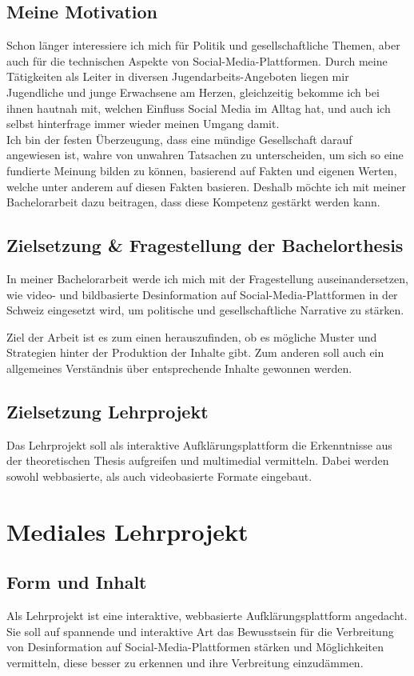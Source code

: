 \documentclass[12pt,a4paper]{article}        %
\begin{document}
\subsection{Meine Motivation}

Schon länger interessiere ich mich für Politik und gesellschaftliche Themen, aber auch für die technischen Aspekte von Social-Media-Plattformen. Durch meine Tätigkeiten als Leiter in diversen Jugendarbeits-Angeboten liegen mir Jugendliche und junge Erwachsene am Herzen, gleichzeitig bekomme ich bei ihnen hautnah mit, welchen Einfluss Social Media im Alltag hat, und auch ich selbst hinterfrage immer wieder meinen Umgang damit. \\
Ich bin der festen Überzeugung, dass eine mündige Gesellschaft darauf angewiesen ist, wahre von unwahren Tatsachen zu unterscheiden, um sich so eine fundierte Meinung bilden zu können, basierend auf Fakten und eigenen Werten, welche unter anderem auf diesen Fakten basieren. Deshalb möchte ich mit meiner Bachelorarbeit dazu beitragen, dass diese Kompetenz gestärkt werden kann.

\subsection{Zielsetzung \& Fragestellung der Bachelorthesis}
In meiner Bachelorarbeit werde ich mich mit der Fragestellung auseinandersetzen, wie video- und bildbasierte Desinformation auf Social-Media-Plattformen in der Schweiz eingesetzt wird, um politische und gesellschaftliche Narrative zu stärken. 

Ziel der Arbeit ist es zum einen herauszufinden, ob es mögliche Muster und Strategien hinter der Produktion der Inhalte gibt. Zum anderen soll auch ein allgemeines Verständnis über entsprechende Inhalte gewonnen werden.

\subsection{Zielsetzung Lehrprojekt}
Das Lehrprojekt soll als interaktive Aufklärungsplattform die Erkenntnisse aus der theoretischen Thesis aufgreifen und multimedial vermitteln. Dabei werden sowohl webbasierte, als auch videobasierte Formate eingebaut. \\

\section{Mediales Lehrprojekt}
\subsection{Form und Inhalt}
Als Lehrprojekt ist eine interaktive, webbasierte Aufklärungsplattform angedacht. Sie soll auf spannende und interaktive Art das Bewusstsein für die Verbreitung von Desinformation auf Social-Media-Plattformen stärken und Möglichkeiten vermitteln, diese besser zu erkennen und ihre Verbreitung einzudämmen.\\
\end{document}
